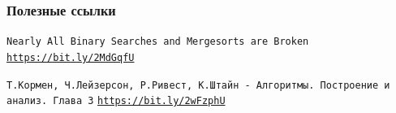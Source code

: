\documentclass[10pt]{beamer}
\begin{document}
\begin{frame}[allowframebreaks]
  \frametitle<presentation>{Полезные ссылки}
    
  \begin{thebibliography}{10}
{
  \beamertemplatearticlebibitems
  
  \texttt{Nearly All Binary Searches and Mergesorts are Broken}
  \newblock \href{https://ai.googleblog.com/2006/06/extra-extra-read-all-about-it-nearly.html}{\texttt{https://bit.ly/2MdGqfU}}
  
  \texttt{Т.Кормен, Ч.Лейзерсон, Р.Ривест, К.Штайн - Алгоритмы. Построение и анализ. Глава 3}
  \newblock \href{https://bit.ly/2wFzphU}{\texttt{https://bit.ly/2wFzphU}}

}


  \end{thebibliography}
\end{frame}
\end{document}
